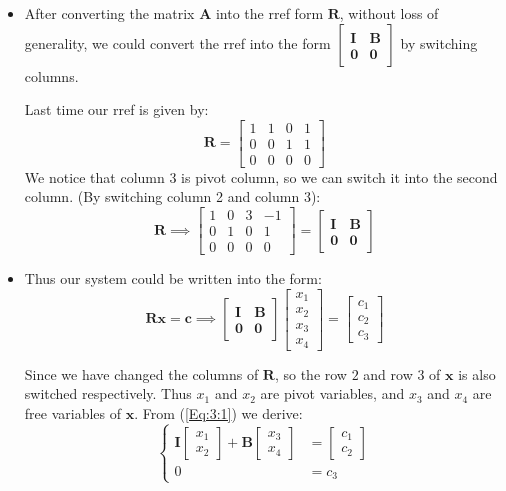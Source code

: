 \begin{itemize}
\item
After converting the matrix $\bm A$ into the rref form $\bm R$, without loss of generality, we could convert the rref into the form $\begin{bmatrix}
\bm I&\bm B\\\bm 0&\bm 0
\end{bmatrix}$ by switching columns.
\begin{example}
Last time our rref is given by:
\[
\bm R = \begin{bmatrix}
1&1&0&1\\0&0&1&1\\0&0&0&0
\end{bmatrix}
\]
We notice that column 3 is pivot column, so we can switch it into the second column. (By switching column 2 and column 3):
\[
\bm R\implies \begin{bmatrix}
1&0&3&-1\\0&1&0&1\\0&0&0&0
\end{bmatrix} = \begin{bmatrix}
\bm I&\bm B\\\bm 0&\bm 0
\end{bmatrix}
\]
\end{example}
\item
Thus our system could be written into the form:
\begin{equation}
\bm{Rx} = \bm c\implies \begin{bmatrix}
\bm I&\bm B\\\bm 0&\bm 0
\end{bmatrix}\begin{bmatrix}
x_1\\x_2\\x_3\\x_4
\end{bmatrix} = \begin{bmatrix}
c_1\\c_2\\c_3
\end{bmatrix}\label{Eq:3:1}
\end{equation}

Since we have changed the columns of $\bm R$, so the row $2$ and row $3$ of $\bm x$ is also switched respectively. Thus $x_1$ and $x_2$ are pivot variables,  and $x_3$ and $x_4$ are free variables of $\bm x$. From (\ref{Eq:3:1}) we derive:
\[
\left\{\begin{aligned}
\bm I\begin{bmatrix}
x_1\\x_2
\end{bmatrix}+ \bm B\begin{bmatrix}
x_3\\x_4
\end{bmatrix} &= \begin{bmatrix}
c_1\\c_2
\end{bmatrix}\\
0 &= c_3
\end{aligned}\right.
\]


\end{itemize}
